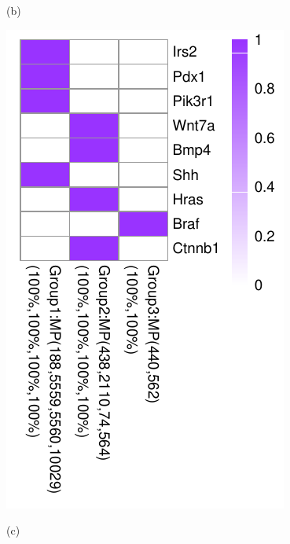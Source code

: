 \documentclass{bmcart}
\begin{document}
\begin{figure}[!h]
\begin{minipage}[b]{.45\linewidth}
    \centerline{(b)}
  \end{minipage}
  \hfil
  \begin{minipage}{.30\linewidth}
   \includegraphics[width=\linewidth]{DrawPictures/v0.pdf}
    \centerline{(c)}
  \end{minipage}
  \hfil
  \begin{minipage}{.3\linewidth}

\end{minipage}
\end{figure}
\end{document}

